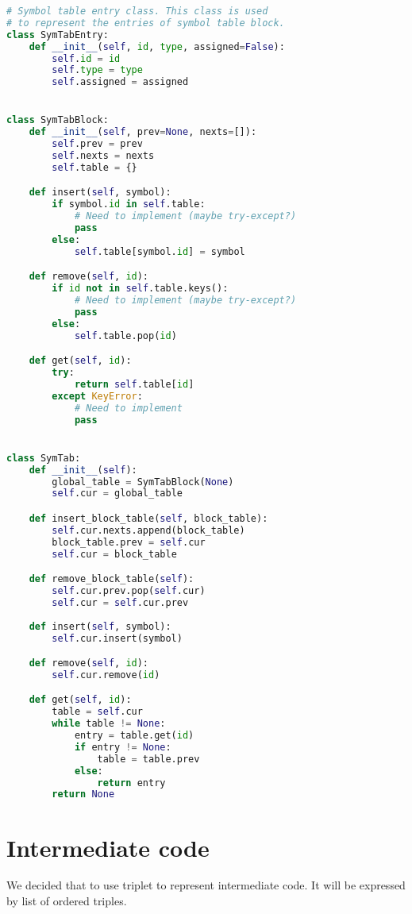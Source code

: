 \documentclass{article}
\begin{document}
	\begin{lstlisting}[language=Python, basicstyle = \footnotesize]
# Symbol table entry class. This class is used
# to represent the entries of symbol table block.
class SymTabEntry:
    def __init__(self, id, type, assigned=False):
        self.id = id
        self.type = type
        self.assigned = assigned


class SymTabBlock:
    def __init__(self, prev=None, nexts=[]):
        self.prev = prev
        self.nexts = nexts
        self.table = {}

    def insert(self, symbol):
        if symbol.id in self.table:
            # Need to implement (maybe try-except?)
            pass
        else:
            self.table[symbol.id] = symbol

    def remove(self, id):
        if id not in self.table.keys():
            # Need to implement (maybe try-except?)
            pass
        else:
            self.table.pop(id)

    def get(self, id):
        try:
            return self.table[id]
        except KeyError:
            # Need to implement
            pass


class SymTab:
    def __init__(self):
        global_table = SymTabBlock(None)
        self.cur = global_table

    def insert_block_table(self, block_table):
        self.cur.nexts.append(block_table)
        block_table.prev = self.cur
        self.cur = block_table

    def remove_block_table(self):
        self.cur.prev.pop(self.cur)
        self.cur = self.cur.prev
        
    def insert(self, symbol):
        self.cur.insert(symbol)

    def remove(self, id):
        self.cur.remove(id)

    def get(self, id):
        table = self.cur
        while table != None:
            entry = table.get(id)
            if entry != None:
                table = table.prev
            else:
                return entry
        return None
	\end{lstlisting}


	\section{Intermediate code}
	We decided that to use triplet to represent intermediate code. It will be expressed by list of ordered triples.

\end{document}

